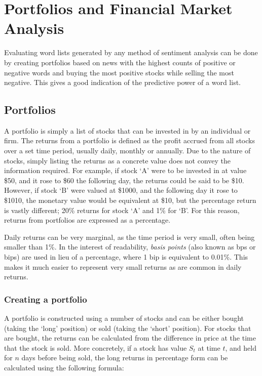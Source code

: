 \section{Portfolios and Financial Market Analysis}
Evaluating word lists generated by any method of sentiment analysis can be done by creating portfolios based on news with the highest counts of positive or negative words and buying the most positive stocks while selling the most negative. This gives a good indication of the predictive power of a word list.

\subsection{Portfolios}
A portfolio is simply a list of stocks that can be invested in by an individual or firm. The returns from a portfolio is defined as the profit accrued from all stocks over a set time period, usually daily, monthly or annually. Due to the nature of stocks, simply listing the returns as a concrete value does not convey the information required. For example, if stock `A' were to be invested in at value \$50, and it rose to \$60 the following day, the returns could be said to be \$10. However, if stock `B' were valued at \$1000, and the following day it rose to \$1010, the monetary value would be equivalent at \$10, but the percentage return is vastly different; 20\% returns for stock `A' and 1\% for `B'. For this reason, returns from portfolios are expressed as a percentage.

Daily returns can be very marginal, as the time period is very small, often being smaller than 1\%. In the interest of readability, \textit{basis points} (also known as bps or bips) are used in lieu of a percentage, where 1 bip is equivalent to 0.01\%. This makes it much easier to represent very small returns as are common in daily returns.

\subsubsection{Creating a portfolio}
A portfolio is constructed using a number of stocks and can be either bought (taking the `long' position) or sold (taking the `short' position). For stocks that are bought, the returns can be calculated from the difference in price at the time that the stock is sold. More concretely, if a stock has value $S_{t}$ at time $t$, and held for $n$ days before being sold, the long returns in percentage form can be calculated using the following formula:

